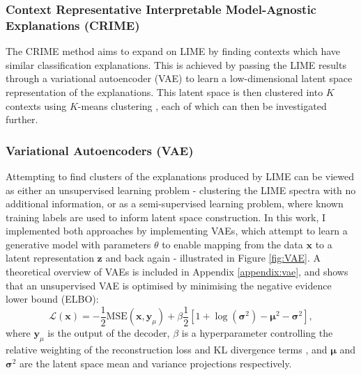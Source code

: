 \subsubsection{Context Representative Interpretable Model-Agnostic Explanations (CRIME)}
\label{sec:methods:crime}
The CRIME method \cite{zaki_explainable_2024} aims to expand on LIME by finding contexts which have similar classification explanations. This is achieved by passing the LIME results through a variational autoencoder (VAE) \cite{kingma_auto-encoding_2022,kingma_semi-supervised_2014} to learn a low-dimensional latent space representation of the explanations. This latent space is then clustered into $K$ contexts using $K$-means clustering \cite{jin_k-means_2011}, each of which can then be investigated further. 

\subsubsection{Variational Autoencoders (VAE)}
\label{sec:vae}

Attempting to find clusters of the explanations produced by LIME can be viewed as either an unsupervised learning problem - clustering the LIME spectra with no additional information, or as a semi-supervised learning problem, where known training labels are used to inform latent space construction. In this work, I implemented both approaches by implementing VAEs, which attempt to learn a generative model with parameters $\theta$ to enable mapping from the data $\boldsymbol{x}$ to a latent representation $\boldsymbol{z}$ and back again - illustrated in Figure \ref{fig:VAE}. A theoretical overview of VAEs is included in Appendix \ref{appendix:vae}, and shows that an unsupervised VAE is optimised by minimising the negative evidence lower bound (ELBO):
\begin{equation}
    \mathcal L(\boldsymbol{x}) = -\frac{1}{2}\text{MSE}(\boldsymbol{x}, \boldsymbol{y}_\mu)+\beta \frac{1}{2}\left[1+\log(\boldsymbol{\sigma}^2)-\boldsymbol{\mu}^2-\boldsymbol{\sigma}^2\right],
    \label{eq:elbo}
\end{equation}
where $\boldsymbol{y}_\mu$ is the output of the decoder, $\beta$ is a hyperparameter controlling the relative weighting of the reconstruction loss and KL divergence terms \cite{higgins_beta-vae_2017}, and $\boldsymbol{\mu}$ and $\boldsymbol{\sigma}^2$ are the latent space mean and variance projections respectively.


